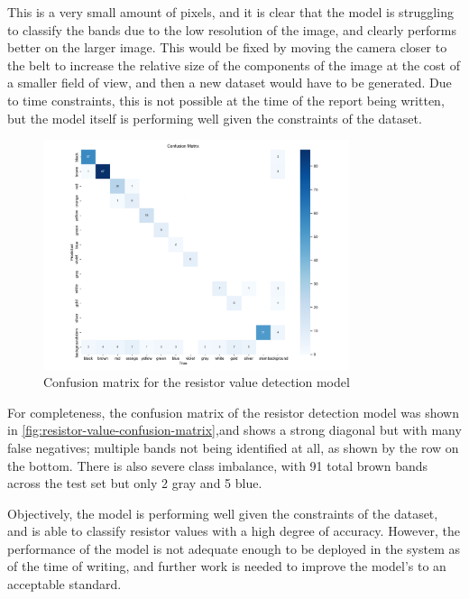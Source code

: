 This is a very small amount of pixels, and it is clear that the model is struggling to classify the bands due to the low resolution of the image, and clearly performs better on the larger image. This would be fixed by moving the camera closer to the belt to increase the relative size of the components of the image at the cost of a smaller field of view, and then a new dataset would have to be generated. Due to time constraints, this is not possible at the time of the report being written, but the model itself is performing well given the constraints of the dataset.

\begin{figure}[H]
  \centering
  \includegraphics[width=0.8\textwidth]{imgs/graphs/confusion_matrix_bands.png}
  \caption{Confusion matrix for the resistor value detection model}
  \label{fig:resistor-value-confusion-matrix}
\end{figure}

For completeness, the confusion matrix of the resistor detection model was shown in \autoref{fig:resistor-value-confusion-matrix},and shows a strong diagonal but with many false negatives; multiple bands not being identified at all, as shown by the row on the bottom. There is also severe class imbalance, with 91 total brown bands across the test set but only 2 gray and 5 blue.

Objectively, the model is performing well given the constraints of the dataset, and is able to classify resistor values with a high degree of accuracy. However, the performance of the model is not adequate enough to be deployed in the system as of the time of writing, and further work is needed to improve the model's to an acceptable standard.

